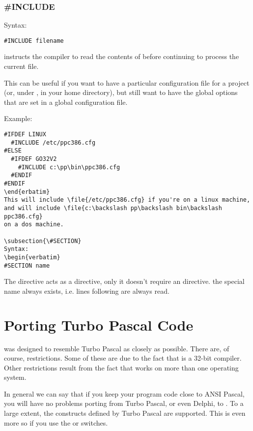 \documentclass{report}
\begin{document}
\subsection{\#INCLUDE}
Syntax:
\begin{verbatim}
#INCLUDE filename
\end{verbatim}
 instructs the compiler to read the contents of
 before continuing to process the current file.

This can be useful if you want to have a particular configuration file
for a project (or, under \linux, in your home directory), but still want to
have the global options that are set in a global configuration file.

Example:
\begin{verbatim}
#IFDEF LINUX
  #INCLUDE /etc/ppc386.cfg
#ELSE
  #IFDEF GO32V2
    #INCLUDE c:\pp\bin\ppc386.cfg
  #ENDIF
#ENDIF
\end{erbatim}
This will include \file{/etc/ppc386.cfg} if you're on a linux machine,
and will include \file{c:\backslash pp\backslash bin\backslash ppc386.cfg}
on a dos machine.

\subsection{\#SECTION}
Syntax:
\begin{verbatim}
#SECTION name
\end{verbatim}
The  directive acts as a  directive, only
it doesn't require an  directive. the special name 
always exists, i.e. lines following  are always read.


\chapter{Porting Turbo Pascal Code}

\fpc was designed to resemble Turbo Pascal as closely as possible. There
are, of course, restrictions. Some of these are due to the fact that \fpc is
a 32-bit compiler. Other restrictions result from the fact that \fpc works
on more than one operating system.

In general we can say that if you keep your program code close to ANSI
Pascal, you will have no problems porting from Turbo Pascal, or even Delphi, to
\fpc. To a large extent, the constructs defined by Turbo Pascal are
supported. This is even more so if you use the  or 
switches.
\end{document}

